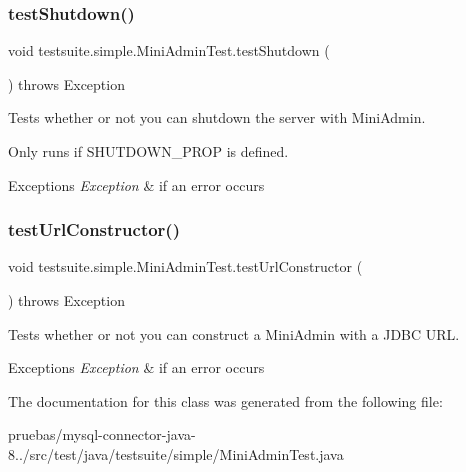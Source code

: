 \subsubsection{\texorpdfstring{test\+Shutdown()}{testShutdown()}}
{\footnotesize\ttfamily void testsuite.\+simple.\+Mini\+Admin\+Test.\+test\+Shutdown (\begin{DoxyParamCaption}{ }\end{DoxyParamCaption}) throws Exception}

Tests whether or not you can shutdown the server with Mini\+Admin.

Only runs if S\+H\+U\+T\+D\+O\+W\+N\+\_\+\+P\+R\+OP is defined.


\begin{DoxyExceptions}{Exceptions}
{\em Exception} & if an error occurs \\
\hline
\end{DoxyExceptions}
\mbox{\label{classtestsuite_1_1simple_1_1_mini_admin_test_ae7432a2cbcda8109289d6240fb07839c}} 
\subsubsection{\texorpdfstring{test\+Url\+Constructor()}{testUrlConstructor()}}
{\footnotesize\ttfamily void testsuite.\+simple.\+Mini\+Admin\+Test.\+test\+Url\+Constructor (\begin{DoxyParamCaption}{ }\end{DoxyParamCaption}) throws Exception}

Tests whether or not you can construct a Mini\+Admin with a J\+D\+BC U\+RL.


\begin{DoxyExceptions}{Exceptions}
{\em Exception} & if an error occurs \\
\hline
\end{DoxyExceptions}


The documentation for this class was generated from the following file\+:\begin{DoxyCompactItemize}
\item 
pruebas/mysql-\/connector-\/java-\/8../src/test/java/testsuite/simple/Mini\+Admin\+Test.\+java\end{DoxyCompactItemize}
